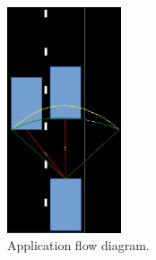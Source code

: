 
\begin{figure}[ht]
    \centering
    \includegraphics[width=0.3\textwidth]{plaatjes/roadeye-road}
    \caption{Application flow diagram.}
    \label{fig:road-situation}
\end{figure}%




